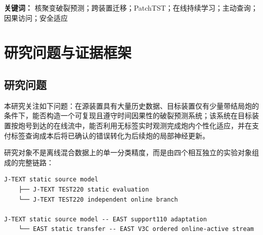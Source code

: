 \documentclass[11pt,a4paper]{article}
\newcommand{\code}[1]{\texttt{\small #1}}
\begin{document}
\begin{abstract}
本文系统描述 J-TEXT 至 EAST 的跨装置破裂预测研究链路，并给出与当前主线代码和封存回执一致的数学定义。源域阶段在 J-TEXT 上训练基于时间片段嵌入的因果 Transformer；破裂炮的监督窗口按照 \(H_i=\max(25\,\mathrm{ms},\mathrm{AdvancedTime}_i)\) 确定，而炮级结局始终由 HDF5 中的 \code{IsDisrupt} 与 \code{DownTime} 提供。迁移阶段以 J-TEXT 静态 checkpoint 为唯一源域父模型：先在 EAST support110 上执行 \code{adapt\_high}（冻结低层、微调最后一个 Transformer block、最终归一化层和新建 EAST 风险头），再冻结这一 EAST 基模型并训练共享 17 维动态残差与目标私有 raw8 残差。在线阶段采用严格的 \emph{predict--seal--query--reveal--update} 顺序：炮内更新只能使用当前炮已经到达的无标签前缀，炮间监督更新只能在被查询炮的结局揭示后执行。J-TEXT TEST220 的三 seed 静态平均及时真正率为 0.866667，误报率为 0.130303；EAST V3C balanced360 开发回放的三 seed 平均 TPR@30ms 由 0.790741 增至 0.792593，误报率由 0.120370 降至 0.114815。严格的同父模型消融表明，当前 EAST 增益是包含炮间监督、错误记忆与报警保护在内的系统级效应，尚不足以将其全部归因于 Transformer 底层表示学习。由于 TEST220 和 balanced360 均参与过方法开发，本文将全部现有结果限定为诊断性证据，并明确独立未来流确认所需的锁定条件。
\end{abstract}

\noindent\textbf{关键词：} 核聚变破裂预测；跨装置迁移；PatchTST；在线持续学习；主动查询；因果访问；安全适应

\tableofcontents
\newpage

\section{研究问题与证据框架}

\subsection{研究问题}

本研究关注如下问题：在源装置具有大量历史数据、目标装置仅有少量带结局炮的条件下，能否构造一个可复现且遵守时间因果性的破裂预测系统；该系统在目标装置按炮号到达的在线流中，能否利用无标签实时观测完成炮内个性化适应，并在支付标签查询成本后将已确认的错误转化为后续炮的局部神经更新。

研究对象不是离线混合数据上的单一分类精度，而是由四个相互独立的实验对象组成的完整链路：

\begin{lstlisting}
J-TEXT static source model
    ├── J-TEXT TEST220 static evaluation
    └── J-TEXT TEST220 independent online branch

J-TEXT static source model -- EAST support110 adaptation
    └── EAST static transfer -- EAST V3C ordered online-active stream
\end{lstlisting}
\end{document}
